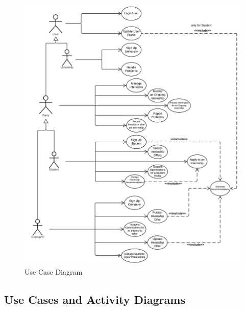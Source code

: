 \begin{figure}[H]
    \begin{center}
        \includegraphics[width=0.9\linewidth]{LaTeXCode/images/Use Case Diagram of S&C.png}
        \caption{Use Case Diagram} 
        \label{fig:use_case_diagram}
    \end{center}
\end{figure}

\newpage
\subsection{Use Cases and Activity Diagrams}
\label{subsec: use_cases}%

\setcounter{ucsteps}{1}
\newcommand{\cucsteps}{\theucsteps\stepcounter{ucsteps}}
\newcommand{\resetucsteps}{\setcounter{ucsteps}{1}}

\setcounter{uc}{1}
\newcommand{\cuc}{\theuc\stepcounter{uc}\resetucsteps}

